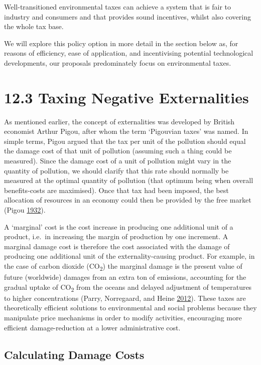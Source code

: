 \documentclass[]{tufte-handout}
\begin{document}
Well-transitioned environmental taxes can achieve a system that is fair
to industry and consumers and that provides sound incentives, whilst
also covering the whole tax base.

We will explore this policy option in more detail in the section below
as, for reasons of efficiency, ease of application, and incentivising
potential technological developments, our proposals predominately focus
on environmental taxes.

\hypertarget{taxing-negative-externalities}{%
\section{12.3 Taxing Negative
Externalities}\label{taxing-negative-externalities}}

As mentioned earlier, the concept of externalities was developed by
British economist Arthur Pigou, after whom the term `Pigouvian taxes'
was named. In simple terms, Pigou argued that the tax per unit of the
pollution should equal the damage cost of that unit of pollution
(assuming such a thing could be measured). Since the damage cost of a
unit of pollution might vary in the quantity of pollution, we should
clarify that this rate should normally be measured at the optimal
quantity of pollution (that optimum being when overall benefits-costs
are maximised). Once that tax had been imposed, the best allocation of
resources in an economy could then be provided by the free market (Pigou
\protect\hyperlink{ref-Pigou1932}{1932}).

A `marginal' cost is the cost increase in producing one additional unit
of a product, i.e.~in increasing the margin of production by one
increment. A marginal damage cost is therefore the cost associated with
the damage of producing one additional unit of the externality-causing
product. For example, in the case of carbon dioxide
(CO\textsubscript{2}) the marginal damage is the present value of future
(worldwide) damages from an extra ton of emissions, accounting for the
gradual uptake of CO\textsubscript{2} from the oceans and delayed
adjustment of temperatures to higher concentrations (Parry, Norregaard,
and Heine \protect\hyperlink{ref-Parry2012}{2012}). These taxes are
theoretically efficient solutions to environmental and social problems
because they manipulate price mechanisms in order to modify activities,
encouraging more efficient damage-reduction at a lower administrative
cost.

\hypertarget{calculating-damage-costs}{%
\subsection{Calculating Damage Costs}\label{calculating-damage-costs}}
\end{document}
